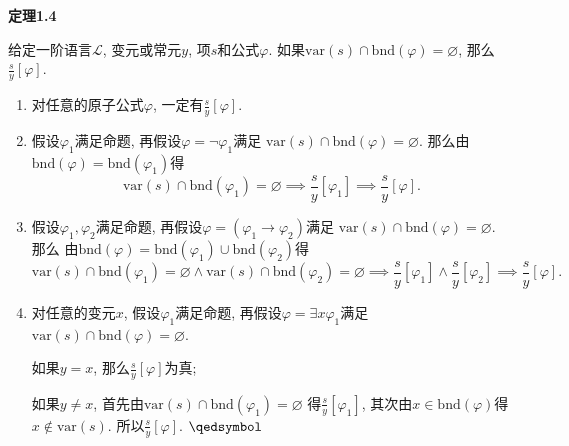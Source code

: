 \vspace{10pt}



\hypertarget{sec:定理1.4}{}
\noindent\textbf{定理1.4}

给定一阶语言$\mathcal{L}$, 变元或常元$y$, 项$s$和公式$\varphi$.
如果$\mathrm{var}(s)\cap\mathrm{bnd}(\varphi)=\varnothing$,
那么$\displaystyle\frac{s}{y}[\varphi]$.


\begin{enumerate}
    \item 对任意的原子公式$\varphi$, 一定有$\displaystyle\frac{s}{y}[\varphi]$.
    
    \vspace{3pt}
    \item 假设$\varphi_1$满足命题, 再假设$\varphi=\neg\varphi_1$满足
    $\mathrm{var}(s)\cap\mathrm{bnd}(\varphi)=\varnothing$.
    那么由$\mathrm{bnd}(\varphi)=\mathrm{bnd}(\varphi_1)$得
    \vspace{3pt}
    \[
        \mathrm{var}(s)\cap\mathrm{bnd}(\varphi_1)=\varnothing\implies
        \frac{s}{y}[\varphi_1]\implies\frac{s}{y}[\varphi].
    \]

    \vspace{3pt}
    \item 假设$\varphi_1,\varphi_2$满足命题,
    再假设$\varphi=(\varphi_1\to\varphi_2)$满足
    $\mathrm{var}(s)\cap\mathrm{bnd}(\varphi)=\varnothing$. 那么
    由$\mathrm{bnd}(\varphi)=\mathrm{bnd}(\varphi_1)\cup\mathrm{bnd}(\varphi_2)$得
    \vspace{3pt}
    \[
        \mathrm{var}(s)\cap\mathrm{bnd}(\varphi_1)=\varnothing\land
        \mathrm{var}(s)\cap\mathrm{bnd}(\varphi_2)=\varnothing\implies
        \frac{s}{y}[\varphi_1]\land\frac{s}{y}[\varphi_2]\implies
        \frac{s}{y}[\varphi].
    \]

    \item 对任意的变元$x$, 假设$\varphi_1$满足命题,
    再假设$\varphi=\exists x\varphi_1$满足
    $\mathrm{var}(s)\cap\mathrm{bnd}(\varphi)=\varnothing$.
    
    \vspace{3pt}\hspace{2.17em}
    如果$y=x$, 那么$\displaystyle\frac{s}{y}[\varphi]$为真;

    \vspace{3pt}\hspace{2.17em}
    如果$y\neq x$, 首先由$\mathrm{var}(s)\cap\mathrm{bnd}(\varphi_1)=\varnothing$
    得$\displaystyle\frac{s}{y}[\varphi_1]$, 其次由$x\in\mathrm{bnd}(\varphi)$得
    $x\notin\mathrm{var}(s)$. 所以$\displaystyle\frac{s}{y}[\varphi]$.
    \hfill $\qedsymbol$
\end{enumerate}

